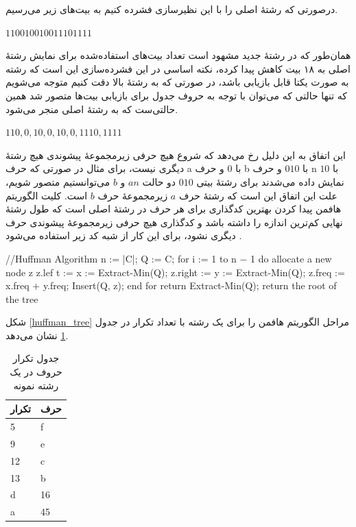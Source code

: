 درصورتی که رشتهٔ اصلی را با این نظیرسازی فشرده کنیم به بیت‌های زیر می‌رسیم.

\begin{center}
        $110010010011101111$
\end{center}

همان‌طور که در رشتهٔ جدید مشهود است تعداد بیت‌های استفاده‌شده برای نمایش
رشتهٔ اصلی به ۱۸ بیت کاهش پیدا کرده، نکته اساسی در این فشرده‌سازی 
این است که رشته به صورت یکتا قابل بازیابی باشد، در صورتی که به رشتهٔ بالا
دقت کنیم متوجه می‌شویم که تنها حالتی که می‌توان با توجه به حروف جدول برای
بازیابی بیت‌ها متصور شد همین حالتی‌ست که به رشتهٔ اصلی منجر می‌شود.
\begin{center}
        $110,0,10,0,10,0,1110,1111$ 
\end{center}

این اتفاق به این دلیل
رخ می‌دهد که شروع هیچ حرفی زیرمجموعهٔ پیشوندی هیچ رشتهٔ دیگری نیست، 
برای مثال در صورتی که حرف a با 
$0$ 
و حرف b
با 
$010$ 
و حرف 
n 
با 
$10$ 
نمایش داده می‌شدند برای رشتهٔ بیتی 
$010$
دو حالت
$an$
و 
$b$
می‌توانستیم متصور شویم، علت این اتفاق این است که رشتهٔ حرف 
$a $
زیرمجموعهٔ حرف 
$b$
است. 
کلیت الگوریتم هافمن پیدا کردن بهترین کدگذاری برای هر حرف در رشتهٔ اصلی 
است که طول رشتهٔ نهایی کم‌ترین اندازه را داشته باشد و کدگذاری هیچ حرفی زیرمجموعهٔ پیشوندی حرف دیگری نشود، برای این کار از شبه کد زیر استفاده می‌شود \cite{huffman}.
\vspace{5mm}

\begin{code}
//Huffman Algorithm
n := |C|;
Q := C;
for i := 1 to n − 1 do
        allocate a new node z
        z.lef t := x := Extract-Min(Q);
        z.right := y := Extract-Min(Q);
        z.freq := x.freq + y.freq;
        Insert(Q, z);
end for
return Extract-Min(Q); {return the root of the tree}
\end{code}
\vspace{5mm}
شکل 
\ref{huffman_tree}
مراحل الگوریتم هافمن را برای یک رشته با تعداد تکرار در جدول
\ref{example_2}
نشان می‌دهد.


\begin{table}[H]
        \centering
        \caption{جدول تکرار حروف در یک رشته نمونه}
        \label{example_2}
        \begin{tabular}{ll}
        \hline
        تکرار & حرف \\ \hline
        5 & f \\
        9 & e \\
        12 & c \\
        13 & b \\
        d & 16 \\
        a & 45 \\ \hline
        \end{tabular}
\end{table}

